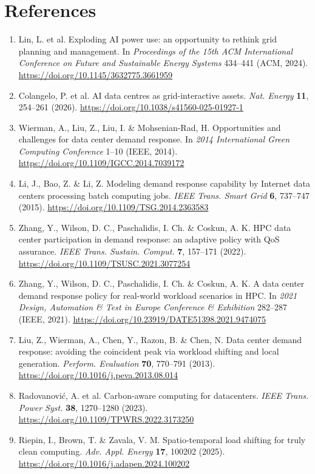 \documentclass[10pt,a4paper]{article}
\begin{document}
\section*{References}
\small
\begin{enumerate}[label=\arabic*.,leftmargin=*,itemsep=4pt]
\item Lin, L. et al. Exploding AI power use: an opportunity to rethink grid planning and management. In \emph{Proceedings of the 15th ACM International Conference on Future and Sustainable Energy Systems} 434–441 (ACM, 2024). \url{https://doi.org/10.1145/3632775.3661959}
\item Colangelo, P. et al. AI data centres as grid-interactive assets. \emph{Nat. Energy} \textbf{11}, 254–261 (2026). \url{https://doi.org/10.1038/s41560-025-01927-1}
\item Wierman, A., Liu, Z., Liu, I. \& Mohsenian-Rad, H. Opportunities and challenges for data center demand response. In \emph{2014 International Green Computing Conference} 1–10 (IEEE, 2014). \url{https://doi.org/10.1109/IGCC.2014.7039172}
\item Li, J., Bao, Z. \& Li, Z. Modeling demand response capability by Internet data centers processing batch computing jobs. \emph{IEEE Trans. Smart Grid} \textbf{6}, 737–747 (2015). \url{https://doi.org/10.1109/TSG.2014.2363583}
\item Zhang, Y., Wilson, D. C., Paschalidis, I. Ch. \& Coskun, A. K. HPC data center participation in demand response: an adaptive policy with QoS assurance. \emph{IEEE Trans. Sustain. Comput.} \textbf{7}, 157–171 (2022). \url{https://doi.org/10.1109/TSUSC.2021.3077254}
\item Zhang, Y., Wilson, D. C., Paschalidis, I. Ch. \& Coskun, A. K. A data center demand response policy for real-world workload scenarios in HPC. In \emph{2021 Design, Automation \& Test in Europe Conference \& Exhibition} 282–287 (IEEE, 2021). \url{https://doi.org/10.23919/DATE51398.2021.9474075}
\item Liu, Z., Wierman, A., Chen, Y., Razon, B. \& Chen, N. Data center demand response: avoiding the coincident peak via workload shifting and local generation. \emph{Perform. Evaluation} \textbf{70}, 770–791 (2013). \url{https://doi.org/10.1016/j.peva.2013.08.014}
\item Radovanović, A. et al. Carbon-aware computing for datacenters. \emph{IEEE Trans. Power Syst.} \textbf{38}, 1270–1280 (2023). \url{https://doi.org/10.1109/TPWRS.2022.3173250}
\item Riepin, I., Brown, T. \& Zavala, V. M. Spatio-temporal load shifting for truly clean computing. \emph{Adv. Appl. Energy} \textbf{17}, 100202 (2025). \url{https://doi.org/10.1016/j.adapen.2024.100202}

\end{enumerate}
\end{document}
